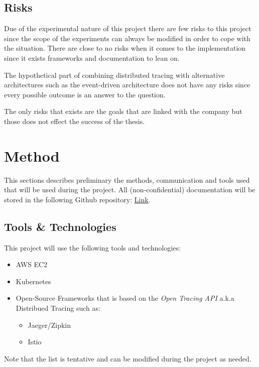 \documentclass[10pt, titlepage, oneside, a4paper]{article}
\begin{document}
\subsection{Risks}

Due of the experimental nature of this project there are few risks to this project since the scope of the experiments can always be modified in order to cope with the situation. There are close to no risks when it comes to the implementation since it exists frameworks and documentation to lean on.

The hypothetical part of combining distributed tracing with alternative architectures such as the event-driven architecture does not have any risks since every possible outcome is an answer to the question. 

The only risks that exists are the goals that are linked with the company but those does not effect the success of the thesis.



\section{Method}

This sections describes preliminary the methods, communication and tools used that will be used during the project. All (non-confidential) documentation will be stored in the following Github repository: \href{https://github.com/NiclasNystrom/Master-Thesis-Distributed-Tracing}{Link}.

\subsection{Tools \& Technologies} \label{sec:tools}
This project will use the following tools and technologies:

\begin{itemize}
	\item AWS EC2
	\item Kubernetes
	\item Open-Source Frameworks that is based on the \textit{Open Tracing API} a.k.a Distribued Tracing such as:
	\begin{itemize}
    	\item Jaeger/Zipkin
    	\item Istio
    \end{itemize}
\end{itemize}

Note that the list is tentative and can be modified during the project as needed.
\end{document}
